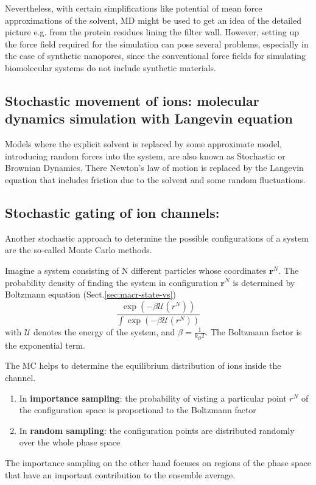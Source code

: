 Nevertheless, with certain simplifications like potential of
mean force approximations of the solvent, MD might be used to get an idea of the detailed
picture e.g. from the protein residues lining the filter wall. However, setting up the force
field required for the simulation can pose several problems, especially in the case of synthetic
nanopores, since the conventional force fields for simulating biomolecular systems do not
include synthetic materials.



\subsection{Stochastic movement of ions: molecular dynamics simulation with
Langevin equation}

Models where the explicit solvent is replaced by some approximate model,
introducing random forces into the system, are also known as Stochastic or
Brownian Dynamics. There Newton's law of motion is replaced by the Langevin
equation that includes friction due to the solvent and some random fluctuations.

\subsection{Stochastic gating of ion channels:}

Another stochastic approach to determine the possible configurations of a system
are the so-called Monte Carlo methods.

Imagine a system consisting of N different particles whose coordinates
$\mathbf{r}^N$. The probability density of finding the system in configuration
$\mathbf{r}^N$ is determined by Boltzmann equation (Sect.\ref{sec:macr-state-vs})
\begin{equation}
\frac{\exp\left( -\beta \mathcal{U}(r^N)\right)}
{\int \exp\left( -\beta \mathcal{U}(r^N)\right)}
\end{equation}
with $\mathcal{U}$ denotes the energy of the system, and $\beta =
\frac{1}{k_BT}$. The Boltzmann factor is the exponential term.

The MC helps to determine the equilibrium distribution of ions inside the
channel.
\begin{enumerate}
  \item In {\bf importance sampling}:  the probability of visting a particular
  point $r^N$ of the configuration space is proportional to the Boltzmann factor

  \item In {\bf random sampling}: the configuration points are distributed randomly
over the whole phase space
\end{enumerate}
The importance sampling on the other hand focuses on regions of the phase space
that have an important contribution to the ensemble average.

